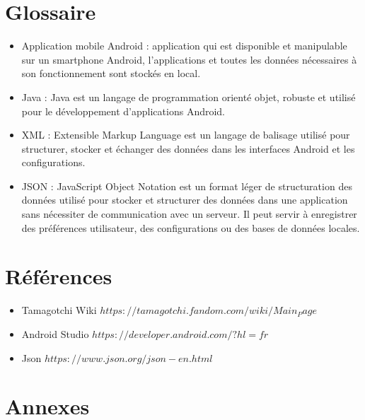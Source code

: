 \documentclass{rapportECL}
\begin{document}
\section{Glossaire} \label{sec:glossaire}
\begin{itemize}[label=\textbullet]
\item Application mobile Android : application qui est disponible et manipulable sur un smartphone Android, l’applications et toutes les données nécessaires à son fonctionnement sont stockés en local.
\item Java : Java est un langage de programmation orienté objet, robuste et utilisé pour le développement d'applications Android.
\item XML : Extensible Markup Language est un langage de balisage utilisé pour structurer, stocker et échanger des données dans les interfaces Android et les configurations.
\item JSON : JavaScript Object Notation est un format léger de structuration des données utilisé pour stocker et structurer des données dans une application sans nécessiter de communication avec un serveur. Il peut servir à enregistrer des préférences utilisateur, des configurations ou des bases de données locales.
\end{itemize}

\section{Références}
\begin{itemize}[label=\textbullet]
\item Tamagotchi Wiki \href{https://tamagotchi.fandom.com/wiki/Main_Page}{$https://tamagotchi.fandom.com/wiki/Main_Page$}
\item Android Studio \href{https://developer.android.com/?hl=fr}{$https://developer.android.com/?hl=fr$}
\item Json \href{https://www.json.org/json-en.html}{$https://www.json.org/json-en.html$}
\end{itemize}

\section{Annexes}
\end{document}
